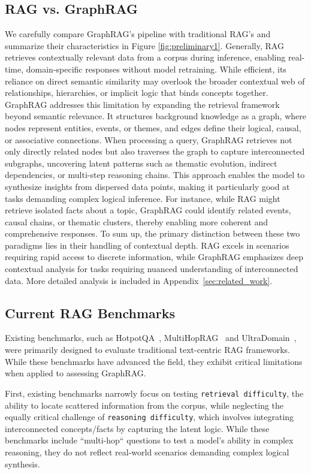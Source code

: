 \documentclass{article} %
\begin{document}
\subsection{RAG vs. GraphRAG}
We carefully compare GraphRAG's pipeline with traditional RAG's and summarize their characteristics in Figure \ref{fig:preliminary1}. Generally, RAG retrieves contextually relevant data from a corpus during inference, enabling real-time, domain-specific responses without model retraining. While efficient, its reliance on direct semantic similarity may overlook the broader contextual web of relationships, hierarchies, or implicit logic that binds concepts together.
GraphRAG addresses this limitation by expanding the retrieval framework beyond semantic relevance. It structures background knowledge as a graph, where nodes represent entities, events, or themes, and edges define their logical, causal, or associative connections. When processing a query, GraphRAG retrieves not only directly related nodes but also traverses the graph to capture interconnected subgraphs, uncovering latent patterns such as thematic evolution, indirect dependencies, or multi-step reasoning chains. This approach enables the model to synthesize insights from dispersed data points, making it particularly good at tasks demanding complex logical inference. For instance, while RAG might retrieve isolated facts about a topic, GraphRAG could identify related events, causal chains, or thematic clusters, thereby enabling more coherent and comprehensive responses.  To sum up, the primary distinction between these two paradigms lies in their handling of contextual depth. RAG excels in scenarios requiring rapid access to discrete information, while GraphRAG emphasizes deep contextual analysis for tasks requiring nuanced understanding of interconnected data. More detailed analysis is included in Appendix~\ref{sec:related_work}.

\subsection{Current RAG Benchmarks}

Existing benchmarks, such as HotpotQA~\citep{yang2018hotpotqa}, MultiHopRAG~\citep{tang2024multihop} and UltraDomain~\citep{qian2024memorag}, were primarily designed to evaluate traditional text-centric RAG frameworks. While these benchmarks have advanced the field, they exhibit critical limitations when applied to assessing GraphRAG.

First, existing benchmarks narrowly focus on testing \texttt{retrieval difficulty}, the ability to locate scattered information from the corpus, while neglecting the equally critical challenge of \texttt{reasoning difficulty}, which involves integrating interconnected concepts/facts by capturing the latent logic. While these benchmarks include ``multi-hop`` questions to test a model’s ability in complex reasoning,  they do not reflect real-world scenarios demanding complex logical synthesis. 
\end{document}

